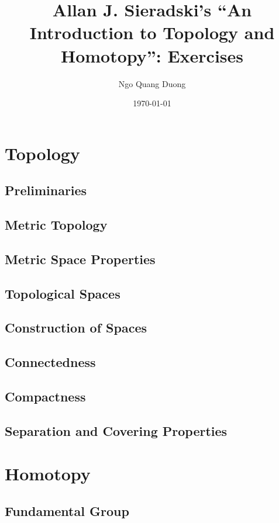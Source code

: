 \documentclass[12pt]{book}
\title{Allan J. Sieradski's ``An Introduction to Topology and Homotopy'': Exercises}
\author{Ngo Quang Duong}
\date{\today}
\theoremstyle{definition}
\begin{document}
\maketitle

\tableofcontents

\part{Topology}

\chapter{Preliminaries}

\chapter{Metric Topology}

\chapter{Metric Space Properties}

\chapter{Topological Spaces}

\chapter{Construction of Spaces}

\chapter{Connectedness}

\chapter{Compactness}

\chapter{Separation and Covering Properties}

\part{Homotopy}

\chapter{Fundamental Group}
\end{document}
